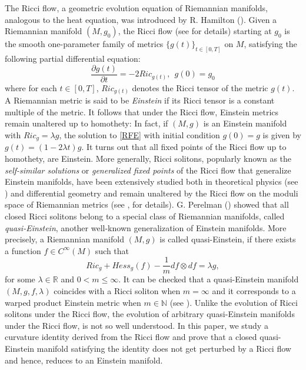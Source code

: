 \documentclass[12pt]{amsart}
\theoremstyle{definition}
\numberwithin{equation}{section}
\begin{document}
The Ricci flow, a geometric evolution equation of Riemannian manifolds, analogous to the heat equation, was introduced by R. Hamilton (\cite{TRH}). Given a Riemannian manifold $(M,g_{0})$, the Ricci flow (see \cite{BCI} for details) starting at $g_{0}$ is the smooth one-parameter family of metrics $\{g(t)\}_{t\in[0,T]}$ on $M$, satisfying the following partial differential equation:
\begin{equation}\label{RFE}
\frac{\partial g(t)}{\partial t} = -2Ric_{g(t)}, \ \ g(0)=g_0
\end{equation}
where for each $t\in[0,T]$, $Ric_{g(t)}$ denotes the Ricci tensor of the metric $g(t)$. A Riemannian metric is said to be \textit{Einstein} if its Ricci tensor is a constant multiple of the metric. It follows that under the Ricci flow, Einstein metrics remain unaltered up to homothety: In fact, if $(M,g)$ is an Einstein manifold with $Ric_g =\lambda g$, the solution to \cref{RFE} with initial condition $g(0) = g$ is given by $g(t) = (1-2\lambda t)g$. It turns out that all fixed points of the Ricci flow up to homothety, are Einstein. More generally, Ricci solitons, popularly known as the \textit{self-similar solutions} or \textit{generalized fixed points} of the Ricci flow that generalize Einstein manifolds, have been extensively studied both in theoretical physics (see \cite{RSTP}) and differential geometry and remain unaltered by the Ricci flow on the moduli space of Riemannian metrics (see \cite{BCRF}, for details). G. Perelman  (\cite{PRF}) showed that all closed Ricci solitons belong to a special class of Riemannian manifolds, called \textit{quasi-Einstein}, another well-known generalization of Einstein manifolds. More precisely, a Riemannian manifold $(M,g)$ is called quasi-Einstein, if there exists a function $f \in C^{\infty}(M)$ such that 
$$Ric_{g} + Hess_{g}(f) - \frac{1}{m}df\otimes df = \lambda g,$$ for some  $\lambda \in \mathbb{R}$ and $0 < m \leq \infty$. It can be checked that a quasi-Einstein manifold $(M,g,f,\lambda)$ coincides with a Ricci soliton when $m = \infty$ and it corresponds to a warped product Einstein metric when $m \in \mathbb{N}$ (see \cite{DYKWP}). Unlike the evolution of Ricci solitons under the Ricci flow, the evolution of arbitrary quasi-Einstein manifolds under the Ricci flow, is not so well understood. In this paper, we study a curvature identity derived from the Ricci flow and prove that a closed quasi-Einstein manifold satisfying the identity does not get perturbed by a Ricci flow and hence, reduces to an Einstein manifold. 
\end{document}
